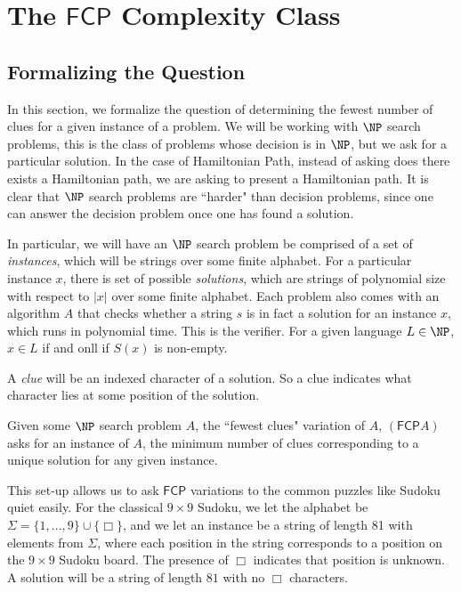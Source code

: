 \documentclass[runningheads,a4paper]{llncs}
\begin{document}
\section{The $\mathsf{FCP}$ Complexity Class}
\label{sec:complexityclass}

\subsection{Formalizing the Question}

In this section, we formalize the question of determining the fewest number of clues for a given instance of a problem. We will be working with $\NP$ search problems, this is the class of problems whose decision is in $\NP$, but we ask for a particular solution. In the case of Hamiltonian Path, instead of asking does there exists a Hamiltonian path, we are asking to present a Hamiltonian path. It is clear that $\NP$ search problems are ``harder" than decision problems, since one can answer the decision problem once one has found a solution.

In particular, we will have an $\NP$ search problem be comprised of a set of \emph{instances}, which will be strings over some finite alphabet. For a particular instance $x$, there is set of possible \emph{solutions}, which are strings of polynomial size with respect to $|x|$ over some finite alphabet. Each problem also comes with an algorithm $A$ that checks whether a string $s$ is in fact a solution for an instance $x$, which runs in polynomial time. This is the verifier. For a given language $L \in \NP$, $x \in L$ if and onll if $S(x)$ is non-empty.

A \emph{clue} will be an indexed character of a solution. So a clue indicates what character lies at some position of the solution.

\begin{definition}
Given some $\NP$ search problem $A$, the ``fewest clues" variation of $A$, $(\mathsf{FCP} A)$ asks for an instance of $A$, the minimum number of clues corresponding to a unique solution for any given instance.
\end{definition}

This set-up allows us to ask $\mathsf{FCP}$ variations to the common puzzles like Sudoku quiet easily. For the classical $9 \times 9$ Sudoku, we let the alphabet be $\Sigma = \{ 1, ..., 9 \} \cup \{ \Box \}$, and we let an instance be a string of length 81 with elements from $\Sigma$, where each position in the string corresponds to a position on the $9 \times 9$ Sudoku board. The presence of $\Box$ indicates that position is unknown. A solution will be a string of length $81$ with no $\Box$ characters. 
\end{document}
